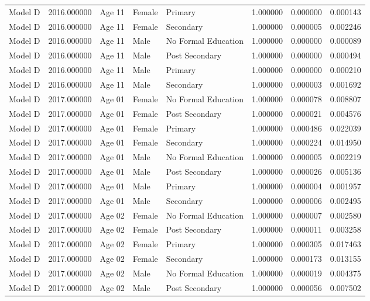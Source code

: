 \begin{table}[ht]
\begin{tabular}{lrlllrrr}
Model D & 2016.000000 & Age 11 & Female & Primary & 1.000000 & 0.000000 & 0.000143 \\
Model D & 2016.000000 & Age 11 & Female & Secondary & 1.000000 & 0.000005 & 0.002246 \\
Model D & 2016.000000 & Age 11 & Male & No Formal Education & 1.000000 & 0.000000 & 0.000089 \\
Model D & 2016.000000 & Age 11 & Male & Post Secondary & 1.000000 & 0.000000 & 0.000494 \\
Model D & 2016.000000 & Age 11 & Male & Primary & 1.000000 & 0.000000 & 0.000210 \\
Model D & 2016.000000 & Age 11 & Male & Secondary & 1.000000 & 0.000003 & 0.001692 \\
Model D & 2017.000000 & Age 01 & Female & No Formal Education & 1.000000 & 0.000078 & 0.008807 \\
Model D & 2017.000000 & Age 01 & Female & Post Secondary & 1.000000 & 0.000021 & 0.004576 \\
Model D & 2017.000000 & Age 01 & Female & Primary & 1.000000 & 0.000486 & 0.022039 \\
Model D & 2017.000000 & Age 01 & Female & Secondary & 1.000000 & 0.000224 & 0.014950 \\
Model D & 2017.000000 & Age 01 & Male & No Formal Education & 1.000000 & 0.000005 & 0.002219 \\
Model D & 2017.000000 & Age 01 & Male & Post Secondary & 1.000000 & 0.000026 & 0.005136 \\
Model D & 2017.000000 & Age 01 & Male & Primary & 1.000000 & 0.000004 & 0.001957 \\
Model D & 2017.000000 & Age 01 & Male & Secondary & 1.000000 & 0.000006 & 0.002495 \\
Model D & 2017.000000 & Age 02 & Female & No Formal Education & 1.000000 & 0.000007 & 0.002580 \\
Model D & 2017.000000 & Age 02 & Female & Post Secondary & 1.000000 & 0.000011 & 0.003258 \\
Model D & 2017.000000 & Age 02 & Female & Primary & 1.000000 & 0.000305 & 0.017463 \\
Model D & 2017.000000 & Age 02 & Female & Secondary & 1.000000 & 0.000173 & 0.013155 \\
Model D & 2017.000000 & Age 02 & Male & No Formal Education & 1.000000 & 0.000019 & 0.004375 \\
Model D & 2017.000000 & Age 02 & Male & Post Secondary & 1.000000 & 0.000056 & 0.007502 \\

\end{tabular}
\end{table}
